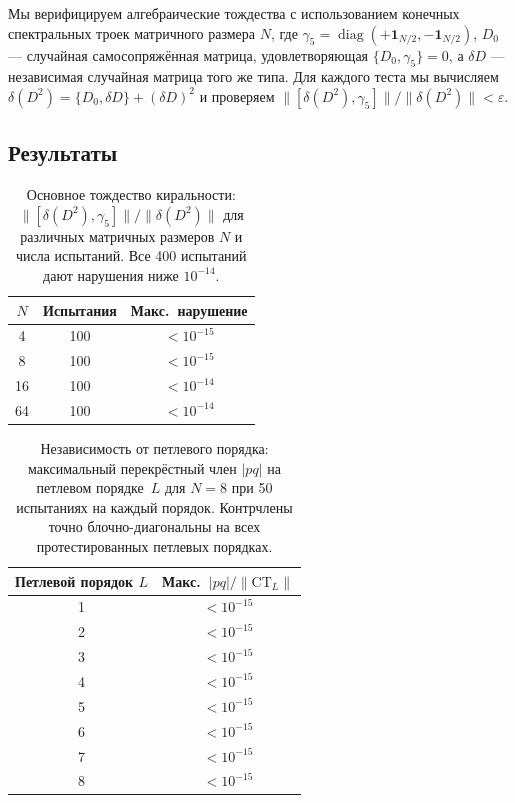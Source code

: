 \documentclass[12pt,a4paper]{article}
\theoremstyle{definition}
\theoremstyle{remark}
\begin{document}
Мы верифицируем алгебраические тождества с использованием конечных
спектральных троек матричного размера $N$, где
$\gamma_5 = \operatorname{diag}(+\mathbf{1}_{N/2},
-\mathbf{1}_{N/2})$, $D_0$ --- случайная самосопряжённая матрица,
удовлетворяющая $\{D_0, \gamma_5\} = 0$, а $\delta D$ --- независимая
случайная матрица того же типа.  Для каждого теста мы вычисляем
$\delta(D^2) = \{D_0, \delta D\} + (\delta D)^2$ и проверяем
$\|[\delta(D^2), \gamma_5]\|/\|\delta(D^2)\| < \varepsilon$.

\subsection{Результаты}

\begin{table}[ht]
\centering
\caption{Основное тождество киральности:
$\|[\delta(D^2),\gamma_5]\|/\|\delta(D^2)\|$ для различных
матричных размеров $N$ и числа испытаний.  Все 400 испытаний дают
нарушения ниже $10^{-14}$.}\label{tab:chirality_core}
\begin{tabular}{@{}ccc@{}}
\toprule
$N$ & Испытания & Макс.\ нарушение \\
\midrule
4  & 100 & $< 10^{-15}$ \\
8  & 100 & $< 10^{-15}$ \\
16 & 100 & $< 10^{-14}$ \\
64 & 100 & $< 10^{-14}$ \\
\bottomrule
\end{tabular}
\end{table}

\begin{table}[ht]
\centering
\caption{Независимость от петлевого порядка: максимальный перекрёстный
член $|pq|$ на петлевом порядке~$L$ для $N = 8$ при 50 испытаниях на
каждый порядок.  Контрчлены точно блочно-диагональны на всех
протестированных петлевых порядках.}\label{tab:loop_order}
\begin{tabular}{@{}cc@{}}
\toprule
Петлевой порядок $L$ & Макс.\ $|pq|/\|\mathrm{CT}_L\|$ \\
\midrule
1 & $< 10^{-15}$ \\
2 & $< 10^{-15}$ \\
3 & $< 10^{-15}$ \\
4 & $< 10^{-15}$ \\
5 & $< 10^{-15}$ \\
6 & $< 10^{-15}$ \\
7 & $< 10^{-15}$ \\
8 & $< 10^{-15}$ \\
\bottomrule
\end{tabular}
\end{table}
\end{document}
